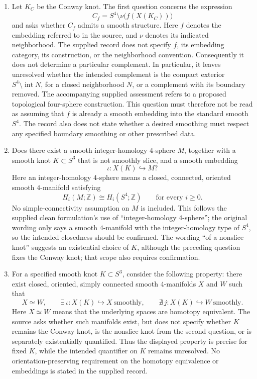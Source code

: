 \documentclass[11pt]{article}
\newcommand{\Z}{\mathbb{Z}}
\begin{document}
\begin{enumerate}
\item Let \(K_C\) be the Conway knot. The first question concerns the expression
\[
C_f=S^4\setminus\nu\bigl(f(X(K_C))\bigr)
\]
and asks whether \(C_f\) admits a smooth structure. Here \(f\) denotes the embedding referred to in the source, and \(\nu\) denotes its indicated neighborhood. The supplied record does not specify \(f\), its embedding category, its construction, or the neighborhood convention. Consequently it does not determine a particular complement. In particular, it leaves unresolved whether the intended complement is the compact exterior \(S^4\setminus\operatorname{int}N\), for a closed neighborhood \(N\), or a complement with its boundary removed. The accompanying supplied assessment refers to a proposed topological four-sphere construction. This question must therefore not be read as assuming that \(f\) is already a smooth embedding into the standard smooth \(S^4\). The record also does not state whether a desired smoothing must respect any specified boundary smoothing or other prescribed data.

\item Does there exist a smooth integer-homology \(4\)-sphere \(M\), together with a smooth knot \(K\subset S^3\) that is not smoothly slice, and a smooth embedding
\[
\iota:X(K)\hookrightarrow M?
\]
Here an integer-homology \(4\)-sphere means a closed, connected, oriented smooth \(4\)-manifold satisfying
\[
H_i(M;\Z)\cong H_i(S^4;\Z)\qquad\text{for every }i\geq 0.
\]
No simple-connectivity assumption on \(M\) is included. This follows the supplied clean formulation's use of ``integer-homology \(4\)-sphere''; the original wording only says a smooth \(4\)-manifold with the integer-homology type of \(S^4\), so the intended closedness should be confirmed. The wording ``of a nonslice knot'' suggests an existential choice of \(K\), although the preceding question fixes the Conway knot; that scope also requires confirmation.

\item For a specified smooth knot \(K\subset S^3\), consider the following property: there exist closed, oriented, simply connected smooth \(4\)-manifolds \(X\) and \(W\) such that
\[
X\simeq W,\qquad
\exists\,\iota:X(K)\hookrightarrow X\ \text{smoothly},\qquad
\nexists\,j:X(K)\hookrightarrow W\ \text{smoothly}.
\]
Here \(X\simeq W\) means that the underlying spaces are homotopy equivalent. The source asks whether such manifolds exist, but does not specify whether \(K\) remains the Conway knot, is the nonslice knot from the second question, or is separately existentially quantified. Thus the displayed property is precise for fixed \(K\), while the intended quantifier on \(K\) remains unresolved. No orientation-preserving requirement on the homotopy equivalence or embeddings is stated in the supplied record.
\end{enumerate}
\end{document}
